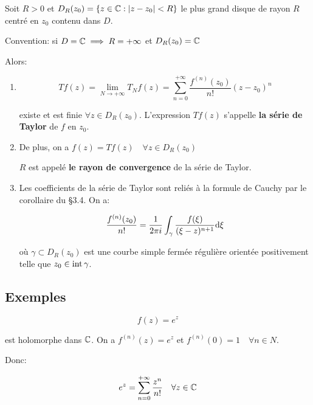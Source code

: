 \begin{result}
    Soit $R > 0$ et $D_R(z_0) = \{z \in \mathbb{C} : \left|z - z_0\right| < R \}$ le plus grand disque de rayon $R$ centré en $z_0$ contenu dans $D$.
    
    Convention: si $D = \mathbb{C} \implies R = +\infty$ et $D_R(z_0) = \mathbb{C}$
    
    Alors:
    
    \begin{enumerate}[label=\arabic{enumi})]
        \item 
        \[
        T f(z) = \lim_{N \rightarrow +\infty} T_N f(z) = \sum_{n = 0}^{+\infty} \frac{f^{(n)}(z_0)}{n!}(z - z_0)^n
        \]
        
        existe et est finie $\forall z \in D_R(z_0)$. L'expression $T f(z)$ s'appelle \textbf{la série de Taylor} de $f$ en $z_0$.
        
        \item 
        De plus, on a $f(z) = T f(z) \quad \forall z \in D_R(z_0)$
        
        $R$ est appelé \textbf{le rayon de convergence} de la série de Taylor.
        
        \item 
        Les coefficients de la série de Taylor sont reliés à la formule de Cauchy par le corollaire du §3.4.
        On a:
        
        \[ \frac{f^{(n)}(z_0)}{n!} = \frac{1}{2\pi i} \int_\gamma \frac{f(\xi)}{(\xi - z)^{n+1}} \mathrm{d}\xi \]
        
        où $\gamma \subset D_R(z_0)$ est une courbe simple fermée régulière orientée positivement telle que $z_0 \in \textrm{int}\, \gamma$.
    \end{enumerate}
\end{result}

\subsection{Exemples}

\begin{example}[1]
    \[f(z) = e^z\]
    
    est holomorphe dans $\mathbb{C}$.
    On a $f^{(n)}(z) = e^z$ et $f^{(n)}(0) = 1 \quad \forall n \in N$.
    
    Donc:
    
    \[ e^z = \sum_{n=0}^{+\infty} \frac{z^n}{n!} \quad \forall z \in \mathbb{C} \]
\end{example}

